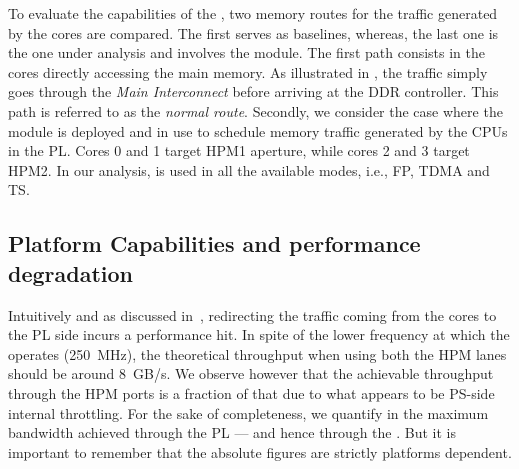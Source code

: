 
To evaluate the capabilities of the \schim, two memory routes for
the traffic generated by the cores are compared. The first serves
as baselines, whereas, the last one is the one under analysis and
involves the \schim module.  The first path consists in the cores
directly accessing the main memory. As illustrated in
, the traffic simply goes through the
\emph{Main Interconnect} before arriving at the DDR controller. This
path is referred to as the \emph{normal route}.
Secondly, we consider the case where the \schim module is deployed and in
use to schedule memory traffic generated by the CPUs in the PL. Cores
0 and 1 target HPM1 aperture, while cores 2 and 3 target HPM2. In our
analysis, \schim is used in all the available modes, i.e., FP, TDMA
and TS.

\subsection{Platform Capabilities and performance degradation}
\label{subsec:platform-capabilities-and-performance-degradation}
Intuitively and as discussed in~\cite{PLIM20}, redirecting the traffic
coming from the cores to the PL side incurs a performance hit. In
spite of the lower frequency at which the \schim operates (250~MHz),
the theoretical throughput when using both the HPM lanes should be
around 8~GB/s. We observe however that the achievable throughput
through the HPM ports is a fraction of that due to what appears to be
PS-side internal throttling. For the sake of completeness, we quantify
in  the maximum bandwidth achieved
through the PL --- and hence through the \schim. But it is important
to remember that the absolute figures are strictly platforms
dependent.

